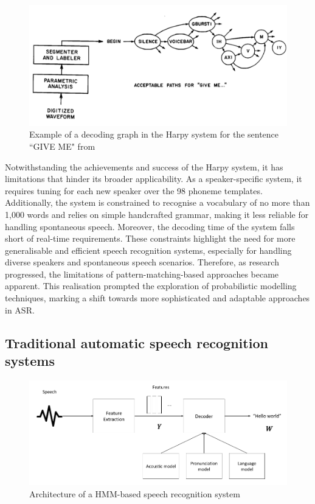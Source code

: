 \begin{figure}[h]
\includegraphics[width=\textwidth]{imgs/harpy.png}
\caption{Example of a decoding graph in the Harpy system for the sentence ``GIVE ME" from \cite{klatt1977review}}
\label{harpy}
\end{figure}

Notwithstanding the achievements and success of the Harpy system, it has limitations that hinder its broader applicability. As a speaker-specific system, it requires tuning for each new speaker over the 98 phoneme templates. Additionally, the system is constrained to recognise a vocabulary of no more than 1,000 words and relies on simple handcrafted grammar, making it less reliable for handling spontaneous speech. Moreover, the decoding time of the system falls short of real-time requirements. These constraints highlight the need for more generalisable and efficient speech recognition systems, especially for handling diverse speakers and spontaneous speech scenarios. Therefore, as research progressed, the limitations of pattern-matching-based approaches became apparent. This realisation prompted the exploration of probabilistic modelling techniques, marking a shift towards more sophisticated and adaptable approaches in \ac{ASR}. 


\subsection{Traditional automatic speech recognition systems} %
\begin{figure}
\includegraphics[width=\textwidth]{imgs/HMM-GMM_architecture.png}
\caption{Architecture of a HMM-based speech recognition system}
\label{HMM-GMM-model}
\end{figure}

